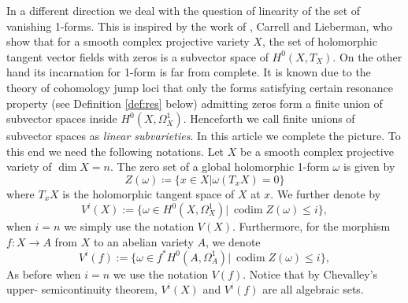 \documentclass[a4paper,12pt,reqno]{amsart}
\theoremstyle{plain}
\theoremstyle{remark}
\newcommand{\C}{\mathbb C}
\newcommand{\codim}{\operatorname{codim}}
\begin{document}
In a different direction we deal with the question
of linearity of the set of vanishing 1-forms. This is
inspired by the work of  \cite{CL73}, Carrell and Lieberman, who show that for a smooth complex projective variety $X$, the set of holomorphic tangent vector fields with zeros is a subvector space of $H^0(X, T_X)$. On the
other hand its incarnation for 1-form is far from complete.
It is known due to the theory of cohomology jump
loci that only the forms satisfying certain resonance property (see Definition \ref{def:res} below) admitting zeros form
a finite union of subvector spaces inside $H^0(X, \Omega_X^1)$.
Henceforth we call finite unions of subvector spaces as \emph{linear subvarieties}.
In this article we complete the picture. To this end we need the 
following notations.
Let $X$ be a smooth complex projective variety of $\dim X=n$. The zero set of a global holomorphic 1-form $\omega$
is given by 
\[Z(\omega) \coloneqq \{x\in X| \omega(T_xX) = 0\}\]
where $T_xX$ is the holomorphic tangent space of $X$ at $x$. 
We further denote by 
\[V^i(X):=\{ \omega\in H^0(X, \Omega_X^1) |\ \codim Z(\omega)\leq i\},\] when $i=n$ we simply use the notation $V(X)$.
Furthermore, for the morphism $f:X\to A$ from $X$ to an abelian variety $A$, we denote
\[V^i(f):=\{ \omega\in f^*H^0(A, \Omega_A^1) |\ \codim Z(\omega)\leq i\},\]
As before when $i=n$ we use the notation $V(f)$. Notice that by Chevalley’s upper- semicontinuity theorem, $V^i(X)$ and $V^i(f)$ are all algebraic sets.

\end{document}
